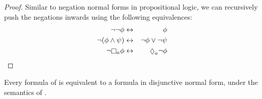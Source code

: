 \begin{proof}
Similar to negation normal forms in propositional logic, we can recursively push
the negations inwards using the following equivalences:
\begin{eqnarray*}
\neg \neg \phi &\iff& \phi\\
\neg (\phi \land \psi) &\iff& \neg \phi \lor \neg \psi\\
\neg \knows_a \phi &\iff& \suspects_a \neg \phi
\end{eqnarray*}
\end{proof}

\begin{lemma}\label{k-dnf}
Every formula of \lang{} is equivalent to a formula in disjunctive normal form,
under the semantics of \logicK{}.
\end{lemma}

